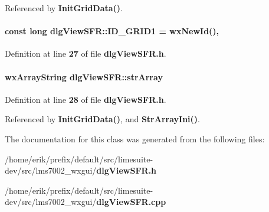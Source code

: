 Referenced by {\bf Init\+Grid\+Data()}.

\paragraph[{I\+D\+\_\+\+G\+R\+I\+D1}]{\setlength{\rightskip}{0pt plus 5cm}const long dlg\+View\+S\+F\+R\+::\+I\+D\+\_\+\+G\+R\+I\+D1 = wx\+New\+Id()\hspace{0.3cm}{\ttfamily [static]}, {\ttfamily [protected]}}\label{classdlgViewSFR_a34699eaf524725b3c3ea9ad776cdc8f7}


Definition at line {\bf 27} of file {\bf dlg\+View\+S\+F\+R.\+h}.

\paragraph[{str\+Array}]{\setlength{\rightskip}{0pt plus 5cm}wx\+Array\+String dlg\+View\+S\+F\+R\+::str\+Array\hspace{0.3cm}{\ttfamily [protected]}}\label{classdlgViewSFR_ab8682ade7aa5709369cd9e34d34a0167}


Definition at line {\bf 28} of file {\bf dlg\+View\+S\+F\+R.\+h}.



Referenced by {\bf Init\+Grid\+Data()}, and {\bf Str\+Array\+Ini()}.



The documentation for this class was generated from the following files\+:\begin{DoxyCompactItemize}
\item 
/home/erik/prefix/default/src/limesuite-\/dev/src/lms7002\+\_\+wxgui/{\bf dlg\+View\+S\+F\+R.\+h}\item 
/home/erik/prefix/default/src/limesuite-\/dev/src/lms7002\+\_\+wxgui/{\bf dlg\+View\+S\+F\+R.\+cpp}\end{DoxyCompactItemize}
